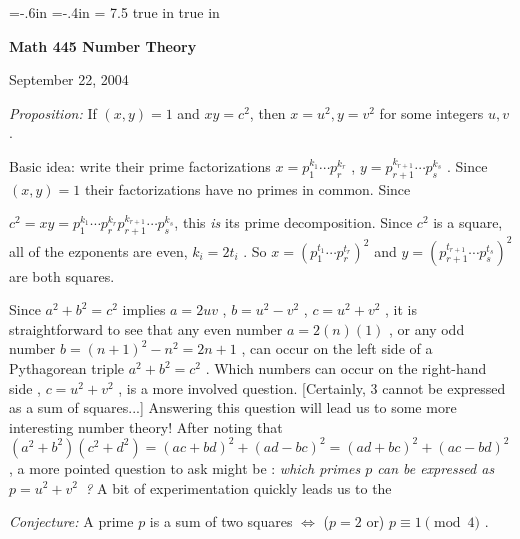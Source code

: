 





\loadmsbm

\nopagenumbers
\parindent=0pt

\voffset=-.6in
\hoffset=-.4in
\hsize = 7.5 true in
 true in


\overfullrule=0pt


\def\ctln{\centerline}
\def\u{\underbar}
\def\ssk{\smallskip}
\def\msk{\medskip}
\def\bsk{\bigskip}


\ctln{\bf Math 445 Number Theory}

\medskip

\ctln{September 22, 2004}

\bigskip


{\it Proposition:} If $(x,y)=1$ and $xy=c^2$, then $x=u^2,y=v^2$ for some integers $u,v$ .

\msk

Basic idea: write their prime factorizations $x=p_1^{k_1}\cdots p_r^{k_r}$ , $y=p_{r+1}^{k_{r+1}}\cdots p_s^{k_s}$ . Since $(x,y)=1$
their factorizations have no primes in common. Since 

$c^2=xy=p_1^{k_1}\cdots p_r^{k_r}p_{r+1}^{k_{r+1}}\cdots p_s^{k_s}$, this
{\it is} its prime decomposition. Since $c^2$ is a square, all of the ezponents are even, $k_i=2t_i$ . So $x=(p_1^{t_1}\cdots p_r^{t_r})^2$ and $y=(p_{r+1}^{t_{r+1}}\cdots p_s^{t_s})^2$ are both squares.

\ssk

Since $a^2+b^2=c^2$ implies $a=2uv$ , $b=u^2-v^2$ , $c=u^2+v^2$ , it is straightforward to see that any even number
$a=2(n)(1)$ , or any odd number $b=(n+1)^2-n^2 = 2n+1$ , can occur on the left side of a Pythagorean triple $a^2+b^2=c^2$ .
Which numbers can occur on the right-hand side , $c=u^2+v^2$ , is a more involved question. [Certainly, 3 cannot be expressed as a 
sum of squares...] Answering this question will lead us to some more interesting number theory!
After noting that $(a^2+b^2)(c^2+d^2) = (ac+bd)^2+(ad-bc)^2 = (ad+bc)^2+(ac-bd)^2$ , a more pointed question to 
ask might be : {\it which primes $p$ can be expressed as $p=u^2+v^2$~?} A bit of experimentation quickly leads us
to the 

\ssk

{\it Conjecture:} A prime $p$ is a sum of two squares $\Leftrightarrow$ ($p=2$ or) $p\equiv 1\pmod{4}$ . 

